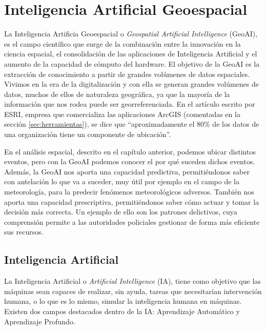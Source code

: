 \chapter*{Inteligencia Artificial Geoespacial}
\setcounter{chapter}{5} 
\setcounter{section}{0}

La Inteligencia Artificia Geoespacial o \textit{Geospatial Artificial Intelligence} (GeoAI),
es el campo científico que surge de la combinación entre la innovación en la ciencia espacial, el consolidación de las aplicaciones de Inteligencia Artificial y el aumento de la capacidad de cómputo del hardware.  
El objetivo de la GeoAI es la extracción de conocimiento a partir de grandes volúmenes de datos espaciales.
Vivimos en la era de la digitalización y con ella se generan grandes volúmenes de datos, muchos de ellos de naturaleza geográfica,
ya que la mayoría de la información que nos rodea puede ser georreferenciada. En el artículo \cite{ESRI} escrito por ESRI, empresa que comercializa las aplicaciones ArcGIS 
(comentadas en la sección \ref{sec:herramientas}), se dice que “aproximadamente el 80\% de los datos de una organización tiene un componente de ubicación”.

En el análisis espacial, descrito en el capítulo anterior, podemos ubicar distintos eventos, pero con la GeoAI podemos conocer el por qué suceden dichos eventos.
Además, la GeoAI nos aporta una capacidad predictiva, permitiéndonos saber con antelación lo que va a suceder, muy útil por ejemplo en el campo de la meteorología, para la predecir fenómenos meteorológicos adversos.
También nos aporta una capacidad prescriptiva, permitiéndonos saber cómo actuar y tomar la decisión más correcta. Un ejemplo de ello son los patrones delictivos, 
cuya comprensión permite a las autoridades policiales gestionar de forma más eficiente sus recursos.

\section{Inteligencia Artificial}
La Inteligencia Artificial o \textit{Artificial Intelligence} (IA), tiene como objetivo que las máquinas sean capaces de realizar, sin ayuda, tareas que necesitarían intervención humana,
o lo que es lo mismo, simular la inteligencia humana en máquinas.
Existen dos campos destacados dentro de la IA: Aprendizaje Automático y Aprendizaje Profundo.

